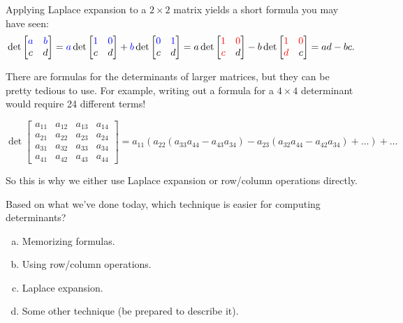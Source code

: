 \begin{observation}
Applying Laplace expansion to a \(2 \times 2\) matrix yields a short formula you may have seen:
\[
  \det \begin{bmatrix} \textcolor{blue}{a} & \textcolor{blue}{b} \\ c & d \end{bmatrix}
=
  \textcolor{blue}{a}\det \begin{bmatrix} \textcolor{blue}{1} & \textcolor{blue}{0} \\ 
    c & d \end{bmatrix} 
+ 
  \textcolor{blue}{b} \det \begin{bmatrix} \textcolor{blue}{0} & \textcolor{blue}{1} \\ 
    c & d \end{bmatrix} 
=
  a\det \begin{bmatrix} \textcolor{red}{1} & \textcolor{red}{0} \\ 
    \textcolor{red}{c} & d \end{bmatrix} 
-
  b \det \begin{bmatrix} \textcolor{red}{1} & \textcolor{red}{0} \\ 
    \textcolor{red}{d} & c \end{bmatrix} 
= 
  ad-bc
.\]

\vspace{1em}

There are formulas for the determinants of larger matrices,
but they can be pretty tedious to use. For example, writing out a
formula for a \(4\times 4\) determinant would require 24 different terms!

\[
   \det\begin{bmatrix}
     a_{11} & a_{12} & a_{13} & a_{14} \\
     a_{21} & a_{22} & a_{23} & a_{24} \\
     a_{31} & a_{32} & a_{33} & a_{34} \\
     a_{41} & a_{42} & a_{43} & a_{44}
   \end{bmatrix}
     =
   a_{11}(a_{22}(a_{33}a_{44}-a_{43}a_{34})-a_{23}(a_{32}a_{44}-a_{42}a_{34})+\dots)+\dots
\]

So this is why we either use Laplace expansion or row/column operations directly.
\end{observation}


\begin{activity}{5}
Based on what we've done today, which technique is easier for computing determinants?
\begin{enumerate}[(a)]
\item Memorizing formulas.
\item Using row/column operations.
\item Laplace expansion.
\item Some other technique (be prepared to describe it).
\end{enumerate}
\end{activity}

